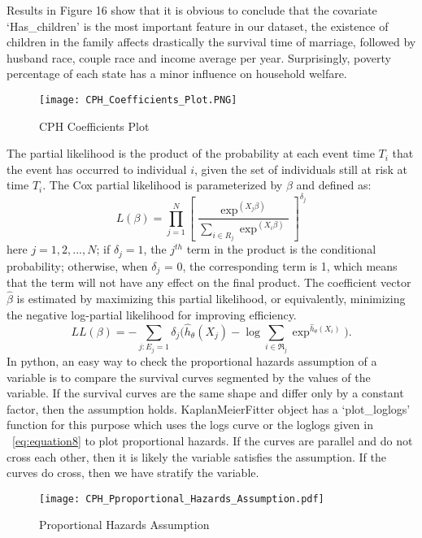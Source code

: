 \documentclass[10pt,twocolumn]{article}
\begin{document}
Results in Figure 16 show that it is  obvious to conclude that the covariate `Has\_children' is the most important feature in our dataset, the existence of children in the family affects drastically the survival time of marriage, followed by husband race, couple race and income average per year. Surprisingly, poverty percentage of each state has a minor influence on household welfare.
\begin{figure}[!htb]
\centering
\texttt{[image: CPH\_Coefficients\_Plot.PNG]}
\caption{CPH Coefficients Plot}
\label{Fig:CPH_Coefficients_Plot}
\end{figure}
The partial likelihood is the product of the probability at each event time $T_i$ that the event has occurred to individual $i$, given the set of individuals still at risk at time $T_i$. The Cox partial likelihood is parameterized by $\beta$ and defined as:
\begin{equation}
L(\beta) = \prod_{j=1}^{N}\left[\frac{\exp^{(X_j\beta)}}{\sum_{i \in R_j}\exp^{(X_i\beta)}}\right]^{\delta_j}
\end{equation}
here $j=1,2,...,N$; if $\delta_j = 1$, the $j^{th}$ term in the product is the conditional probability; otherwise, when $\delta_j$ = 0, the corresponding term is 1, which means that the term will not have any effect on the final product. The coefficient vector $\hat{\beta}$ is estimated by maximizing this partial likelihood, or equivalently, minimizing the
negative log-partial likelihood for improving efficiency.
\begin{equation}
\label{eq:equation8}
LL(\beta) = -\sum_{j: E_j=1} \delta_j\bigg( \hat{h}_{\theta }(X_j) - \log \sum_{i \in \mathbb{\Re}_j}\exp^{\hat{h}_{\theta }(X_i)}\bigg). 
\end{equation}
In python, an easy way to check the proportional hazards assumption of a variable is to compare the survival curves segmented by the values of the variable. If the survival curves are the same shape and differ only by a constant factor, then the assumption holds. KaplanMeierFitter object has a `plot\_loglogs' function for this purpose which uses the logs curve or the loglogs given in ~\ref{eq:equation8} to plot proportional hazards. If the curves are parallel and do not cross each other, then it is likely the variable satisfies the assumption. If the curves do cross, then we have stratify the variable.\\ 
\begin{figure}[!htb]
\centering
\texttt{[image: CPH\_Pproportional\_Hazards\_Assumption.pdf]}
\caption{Proportional Hazards Assumption}
\label{Fig:Pproportional_Hazards_Assumption}
\end{figure}
\end{document}
